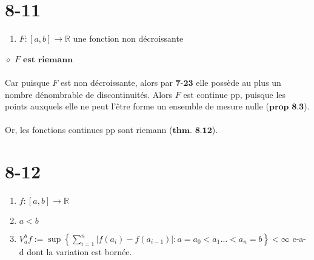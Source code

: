 \documentclass[a4paper,10pt]{article}
\begin{document}
\section*{8-11}
\begin{enumerate}
 \item $F : [a,b] \rightarrow \mathbb{R}$ une fonction non décroissante
\end{enumerate}
$\diamond$ $F \textbf{ est riemann}$
\\
\\
Car puisque $F$ est non décroissante, alors par $\textbf{7-23}$ elle possède au plus un nombre 
dénombrable de discontinuités. Alors $F$ est continue pp, puisque les points auxquels elle ne peut 
l'être forme un ensemble de mesure nulle ($\textbf{prop 8.3}$).
\\
\\
Or, les fonctions continues pp sont riemann ($\textbf{thm. 8.12}$).

\section*{8-12}
\begin{enumerate}
 \item $f:[a,b] \rightarrow \mathbb{R}$ 
 \item $a < b$
 \item $V^b_a f := \sup \left\{ \sum\limits_{i=1}^n |f(a_i) - f(a_{i-1})| : a=a_0 < a_1 \dots < a_n = b \right\} < \infty$ c-a-d dont la variation est bornée.
\end{enumerate}
\end{document}

